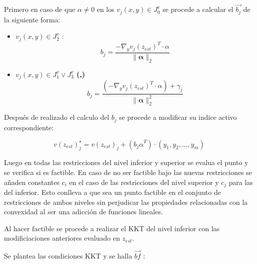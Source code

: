 Primero en caso de que $\alpha \neq 0$ en los $v_j(x,y) \in J_0^v$ se procede a calcular el $\vec{b_j}$ de la siguiente forma:

\begin{itemize}
    \item \textbf{ $v_j(x,y) \in J_2^v$ }:
        \begin{equation}
            b_j=  \frac{-\nabla_{y}{v_j(z_{est})}^T \cdot \alpha}{\|\mathbf{\alpha} \|_2}
        \end{equation}
    \item \textbf{$v_j(x,y) \in J_1^v \lor J_3^v$ (,)}\\
    \begin{equation}
        b_j=  \frac{(-\nabla_{y}{v_j(z_{est})}^T \cdot \alpha)+\gamma_j}{\|\mathbf{\alpha} \|_2^2}
    \end{equation}
\end{itemize}


Después de realizado el calculo del $b_j$ se procede a modificar su indice activo correspondiente:

\begin{equation}
	v(z_{est})_{j}^{\star}=v(z_{est})_{j}+ ({b_j\alpha}^T)\cdot (y_1,y_2,\dots,y_m)
\end{equation}


Luego en todas las restricciones del nivel inferior y superior
se evalua el punto y se verifica si es factible. En caso de no ser factible 
bajo las nuevas restricciones se añaden constantes $c_i$ en el caso de las restricciones del
nivel superior y $c_j$ para las del inferior. Esto conlleva a que sea un punto factible en el conjunto
de restricciones de ambos niveles sin perjudicar las propiedades relacionadas con la convexidad al ser una adicción
de funciones lineales. 

Al hacer factible se procede a realizar el KKT del nivel inferior con las modificiaciones anteriores evaluado en $z_{est}$.

Se plantea las condiciones KKT y se halla $\vec{bf}$ :

